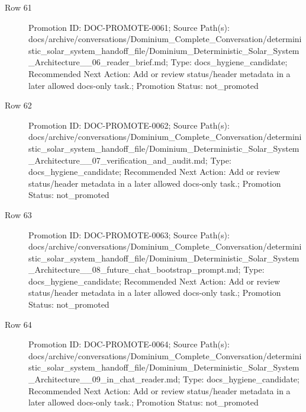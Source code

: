 \documentclass[9pt,a4paper,openany]{book}
\begin{document}
\begin{description}
\item[Row 61] Promotion ID: DOC-\allowbreak{}PROMOTE-\allowbreak{}0061; Source Path(s): docs/\allowbreak{}archive/\allowbreak{}conversations/\allowbreak{}Dominium\_\allowbreak{}Complete\_\allowbreak{}Conversation/\allowbreak{}deterministic\_\allowbreak{}solar\_\allowbreak{}system\_\allowbreak{}handoff\_\allowbreak{}file/\allowbreak{}Dominium\_\allowbreak{}Deterministic\_\allowbreak{}Solar\_\allowbreak{}System\_\allowbreak{}Architecture\_\allowbreak{}\_\allowbreak{}06\_\allowbreak{}reader\_\allowbreak{}brief.\allowbreak{}md; Type: docs\_\allowbreak{}hygiene\_\allowbreak{}candidate; Recommended Next Action: Add or review status/\allowbreak{}header metadata in a later allowed docs-\allowbreak{}only task.\allowbreak{}; Promotion Status: not\_\allowbreak{}promoted
\item[Row 62] Promotion ID: DOC-\allowbreak{}PROMOTE-\allowbreak{}0062; Source Path(s): docs/\allowbreak{}archive/\allowbreak{}conversations/\allowbreak{}Dominium\_\allowbreak{}Complete\_\allowbreak{}Conversation/\allowbreak{}deterministic\_\allowbreak{}solar\_\allowbreak{}system\_\allowbreak{}handoff\_\allowbreak{}file/\allowbreak{}Dominium\_\allowbreak{}Deterministic\_\allowbreak{}Solar\_\allowbreak{}System\_\allowbreak{}Architecture\_\allowbreak{}\_\allowbreak{}07\_\allowbreak{}verification\_\allowbreak{}and\_\allowbreak{}audit.\allowbreak{}md; Type: docs\_\allowbreak{}hygiene\_\allowbreak{}candidate; Recommended Next Action: Add or review status/\allowbreak{}header metadata in a later allowed docs-\allowbreak{}only task.\allowbreak{}; Promotion Status: not\_\allowbreak{}promoted
\item[Row 63] Promotion ID: DOC-\allowbreak{}PROMOTE-\allowbreak{}0063; Source Path(s): docs/\allowbreak{}archive/\allowbreak{}conversations/\allowbreak{}Dominium\_\allowbreak{}Complete\_\allowbreak{}Conversation/\allowbreak{}deterministic\_\allowbreak{}solar\_\allowbreak{}system\_\allowbreak{}handoff\_\allowbreak{}file/\allowbreak{}Dominium\_\allowbreak{}Deterministic\_\allowbreak{}Solar\_\allowbreak{}System\_\allowbreak{}Architecture\_\allowbreak{}\_\allowbreak{}08\_\allowbreak{}future\_\allowbreak{}chat\_\allowbreak{}bootstrap\_\allowbreak{}prompt.\allowbreak{}md; Type: docs\_\allowbreak{}hygiene\_\allowbreak{}candidate; Recommended Next Action: Add or review status/\allowbreak{}header metadata in a later allowed docs-\allowbreak{}only task.\allowbreak{}; Promotion Status: not\_\allowbreak{}promoted
\item[Row 64] Promotion ID: DOC-\allowbreak{}PROMOTE-\allowbreak{}0064; Source Path(s): docs/\allowbreak{}archive/\allowbreak{}conversations/\allowbreak{}Dominium\_\allowbreak{}Complete\_\allowbreak{}Conversation/\allowbreak{}deterministic\_\allowbreak{}solar\_\allowbreak{}system\_\allowbreak{}handoff\_\allowbreak{}file/\allowbreak{}Dominium\_\allowbreak{}Deterministic\_\allowbreak{}Solar\_\allowbreak{}System\_\allowbreak{}Architecture\_\allowbreak{}\_\allowbreak{}09\_\allowbreak{}in\_\allowbreak{}chat\_\allowbreak{}reader.\allowbreak{}md; Type: docs\_\allowbreak{}hygiene\_\allowbreak{}candidate; Recommended Next Action: Add or review status/\allowbreak{}header metadata in a later allowed docs-\allowbreak{}only task.\allowbreak{}; Promotion Status: not\_\allowbreak{}promoted

\end{description}
\end{document}
